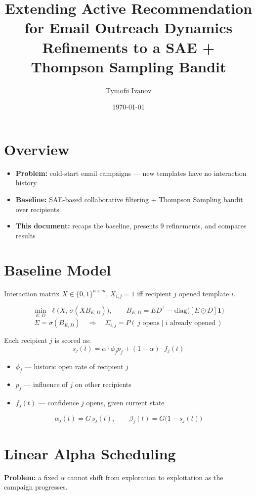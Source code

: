 \documentclass[12pt,a4paper]{article}
\title{Extending Active Recommendation for Email Outreach Dynamics\\[4pt]
\large Refinements to a SAE + Thompson Sampling Bandit}
\author{Tymofii Ivanov}
\date{\today}
\begin{document}
\maketitle

\section{Overview}
\large
\begin{itemize}
  \item \textbf{Problem:} cold-start email campaigns --- new templates have no interaction history
  \item \textbf{Baseline:} SAE-based collaborative filtering + Thompson Sampling bandit over recipients
  \item \textbf{This document:} recaps the baseline, presents 9 refinements, and compares results
\end{itemize}
\normalsize

\clearpage
\section{Baseline Model}
\large
Interaction matrix $X \in \{0,1\}^{n \times m}$, $X_{i,j}=1$ iff recipient $j$ opened template $i$.

\[
  \min_{E,D} \; \ell\big(X,\, \sigma(X B_{E,D})\big), \qquad
  B_{E,D} = ED^\top - \mathrm{diag}\big([E\odot D]\mathbf{1}\big)
\]
\[
  \Sigma = \sigma(B_{E,D}) \quad \Rightarrow \quad
  \Sigma_{i,j} = P(\,j \text{ opens} \mid i \text{ already opened}\,)
\]

Each recipient $j$ is scored as:
\[
  s_j(t) = \alpha \cdot \phi_j p_j + (1-\alpha)\cdot f_j(t)
\]
\begin{itemize}
  \item $\phi_j$ --- historic open rate of recipient $j$
  \item $p_j$ --- influence of $j$ on other recipients
  \item $f_j(t)$ --- confidence $j$ opens, given current state
\end{itemize}
\[
  \alpha_j(t) = G\, s_j(t), \qquad \beta_j(t) = G\big(1-s_j(t)\big)
\]
\normalsize

\clearpage
\section{Linear Alpha Scheduling}
\large
\textbf{Problem:} a fixed $\alpha$ cannot shift from exploration to exploitation as the campaign progresses.
\end{document}
